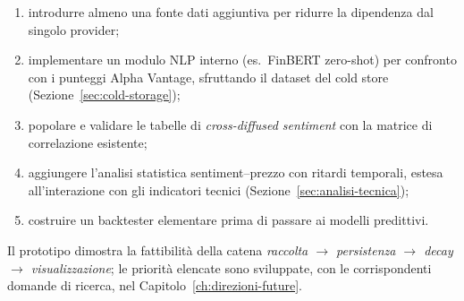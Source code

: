 \begin{enumerate}
  \item introdurre almeno una fonte dati aggiuntiva per ridurre la dipendenza dal singolo provider;
  \item implementare un modulo NLP interno (es.\ FinBERT zero-shot) per confronto con i punteggi Alpha Vantage, sfruttando il dataset del cold store (Sezione~\ref{sec:cold-storage});
  \item popolare e validare le tabelle di \emph{cross-diffused sentiment} con la matrice di correlazione esistente;
  \item aggiungere l'analisi statistica sentiment--prezzo con ritardi temporali, estesa all'interazione con gli indicatori tecnici (Sezione~\ref{sec:analisi-tecnica});
  \item costruire un backtester elementare prima di passare ai modelli predittivi.
\end{enumerate}

Il prototipo dimostra la fattibilità della catena \emph{raccolta $\rightarrow$ persistenza $\rightarrow$ decay $\rightarrow$ visualizzazione}; le priorità elencate sono sviluppate, con le corrispondenti domande di ricerca, nel Capitolo~\ref{ch:direzioni-future}.

